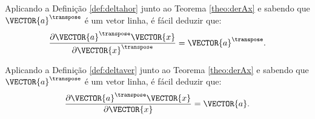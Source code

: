 \newpage
\begin{corollary}\label{coro:derAx3}
Aplicando a Definição \ref{def:deltahor} junto ao Teorema \ref{theo:derAx} e sabendo que $\VECTOR{a}^{\transpose}$
é um vetor linha, é
fácil deduzir que:
\begin{equation}
\frac{\partial \VECTOR{a}^{\transpose}\VECTOR{x}}{\partial \VECTOR{x}^{\transpose}}=\VECTOR{a}^{\transpose}.
\end{equation}
\end{corollary}

\begin{corollary}\label{coro:derAx4}
Aplicando a Definição \ref{def:deltaver} junto ao Teorema \ref{theo:derAx} e sabendo que $\VECTOR{a}^{\transpose}$
é um vetor linha, é
fácil deduzir que:
\begin{equation}
\frac{\partial \VECTOR{a}^{\transpose}\VECTOR{x}}{\partial \VECTOR{x}}=\VECTOR{a}.
\end{equation}
\end{corollary}
